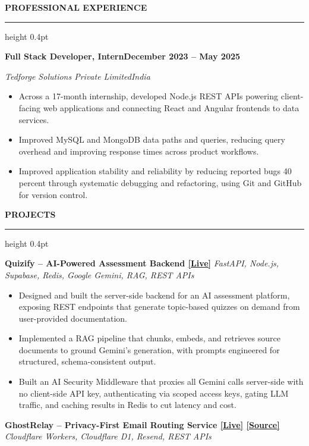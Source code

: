 \documentclass[10pt,a4paper]{article}
\newcommand{\resumeSection}[1]{%
  \vspace{5pt}
  {\normalsize\bfseries\color{heading} #1}\par
  \vspace{1pt}
  {\color{rulecolor}\hrule height 0.4pt}
  \vspace{3pt}
}
\newcommand{\resumeSubheading}[4]{%
  \textbf{#1}\hfill\textbf{#2}\par
  \textit{#3}\hfill\textit{#4}\par
  \vspace{-0.15em}
}
\newcommand{\projectHeading}[2]{%
  \textbf{#1} \textbar{} \textit{#2}\par
  \vspace{-0.15em}
}
\begin{document}
\normalsize

\resumeSection{PROFESSIONAL EXPERIENCE}

\resumeSubheading
{Full Stack Developer, Intern}
{December 2023 -- May 2025}
{Tedforge Solutions Private Limited}
{India}

\begin{itemize}
  \item Across a 17-month internship, developed Node.js REST APIs powering
  client-facing web applications and connecting React and Angular frontends
  to data services.

  \item Improved MySQL and MongoDB data paths and queries, reducing query
  overhead and improving response times across product workflows.

  \item Improved application stability and reliability by reducing reported
  bugs 40 percent through systematic debugging and refactoring, using Git and
  GitHub for version control.
\end{itemize}

\resumeSection{PROJECTS}

\projectHeading
{Quizify -- AI-Powered Assessment Backend \href{https://quizify.ash-labs.tech}{[Live]}}
{FastAPI, Node.js, Supabase, Redis, Google Gemini, RAG, REST APIs}

\begin{itemize}
  \item Designed and built the server-side backend for an AI assessment
  platform, exposing REST endpoints that generate topic-based quizzes on
  demand from user-provided documentation.

  \item Implemented a RAG pipeline that chunks, embeds, and retrieves source
  documents to ground Gemini's generation, with prompts engineered for
  structured, schema-consistent output.

  \item Built an AI Security Middleware that proxies all Gemini calls
  server-side with no client-side API key, authenticating via scoped access
  keys, gating LLM traffic, and caching results in Redis to cut latency
  and cost.
\end{itemize}

\projectHeading
{GhostRelay -- Privacy-First Email Routing Service \href{https://ghostrelay.me}{[Live]} \href{https://github.com/Tech-aficionado/GhostRelay---Open-Source}{[Source]}}
{Cloudflare Workers, Cloudflare D1, Resend, REST APIs}
\end{document}

